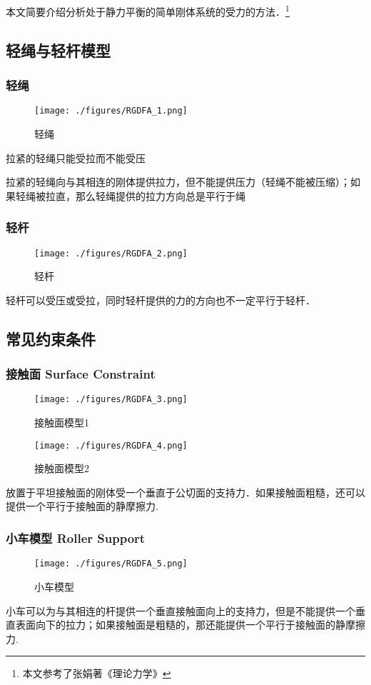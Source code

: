 
本文简要介绍分析处于静力平衡的简单刚体系统的受力的方法．\footnote{本文参考了张娟著《理论力学》}

\subsection{轻绳与轻杆模型}
\subsubsection{轻绳}
\begin{figure}[ht]
\centering
\texttt{[image: ./figures/RGDFA\_1.png]}
\caption{轻绳} \label{RGDFA_fig1}
\end{figure}
拉紧的轻绳只能受拉而不能受压

拉紧的轻绳向与其相连的刚体提供拉力，但不能提供压力（轻绳不能被压缩）；如果轻绳被拉直，那么轻绳提供的拉力方向总是平行于绳

\subsubsection{轻杆}
\begin{figure}[ht]
\centering
\texttt{[image: ./figures/RGDFA\_2.png]}
\caption{轻杆} \label{RGDFA_fig2}
\end{figure}
轻杆可以受压或受拉，同时轻杆提供的力的方向也不一定平行于轻杆．

\subsection{常见约束条件}
\subsubsection{接触面 Surface Constraint}
\begin{figure}[ht]
\centering
\texttt{[image: ./figures/RGDFA\_3.png]}
\caption{接触面模型1} \label{RGDFA_fig3}
\end{figure}
\begin{figure}[ht]
\centering
\texttt{[image: ./figures/RGDFA\_4.png]}
\caption{接触面模型2} \label{RGDFA_fig4}
\end{figure}
放置于平坦接触面的刚体受一个垂直于公切面的支持力．如果接触面粗糙，还可以提供一个平行于接触面的静摩擦力.
\subsubsection{小车模型 Roller Support}
\begin{figure}[ht]
\centering
\texttt{[image: ./figures/RGDFA\_5.png]}
\caption{小车模型} \label{RGDFA_fig5}
\end{figure}
小车可以为与其相连的杆提供一个垂直接触面向上的支持力，但是不能提供一个垂直表面向下的拉力；如果接触面是粗糙的，那还能提供一个平行于接触面的静摩擦力.
